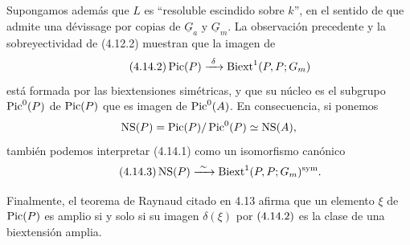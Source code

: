 Supongamos además que $L$ es ``resoluble escindido sobre $k$'', en el
sentido de que admite una dévissage por copias de $\underline G_a$ y
$\underline G_m$. La observación precedente y la sobreyectividad de
(4.12.2) muestran que la imagen de
\begin{equation}\tag{4.14.2}
 \Pic(P)\xrightarrow{\ \delta\ }
 \Biext^1(P,P;\underline G_m)
\end{equation}
está formada por las biextensiones simétricas, y que su núcleo es el
subgrupo $\Pic^0(P)$ de $\Pic(P)$ que es imagen de $\Pic^0(A)$. En
consecuencia, si ponemos
\[
 \operatorname{NS}(P)=\Pic(P)/\Pic^0(P)
 \simeq\operatorname{NS}(A),
\]
también podemos interpretar (4.14.1) como un isomorfismo canónico
\begin{equation}\tag{4.14.3}
 \operatorname{NS}(P)
 \xrightarrow{\ \sim\ }
 \Biext^1(P,P;\underline G_m)^{\mathrm{sym}}.
\end{equation}

Finalmente, el teorema de Raynaud citado en 4.13 afirma que un elemento
$\xi$ de $\Pic(P)$ es amplio si y solo si su imagen $\delta(\xi)$ por
$(\sisi{4.14.1}{4.14.2})$ es la clase de una biextensión amplia.
